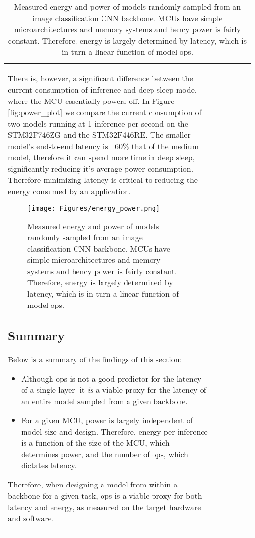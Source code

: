 \documentclass{article}
\begin{document}
\begin{table}[t]
\begin{tabular}{l| c | c | c | c | c}
\if0
There is, however, a significant difference between the current consumption of inference and deep sleep mode, where the MCU essentially powers off. 
In Figure \ref{fig:power_plot} we compare the current consumption of two models running at 1 inference per second on the STM32F746ZG and the STM32F446RE.
The smaller model's end-to-end latency is ~60\% that of the medium model, therefore it can spend more time in deep sleep, significantly reducing it's average power consumption. Therefore minimizing latency is critical to reducing the energy consumed by an application.
\fi



\begin{figure}[t]
    \texttt{[image: Figures/energy\_power.png]}
     \vspace{-20pt}
     \caption{Measured energy and power of models randomly sampled from an image classification CNN backbone.
     MCUs have simple microarchitectures and memory systems and hency power is fairly constant.
     Therefore, energy is largely determined by latency, which is in turn a linear function of model ops.
     }
     \label{fig:model_energy_power}
\end{figure}








\subsection{Summary}

Below is a summary of the findings of this section:
\begin{itemize}
    \item Although ops is not a good predictor for the latency of a single layer, it \textit{is} a viable proxy for the latency of an entire model sampled from a given backbone.
\item For a given MCU, power is largely independent of model size and design.
    Therefore, energy per inference is a function of the size of the MCU, which determines power, and the number of ops, which dictates latency.
\end{itemize}

Therefore, when designing a model from within a backbone for a given task, ops is a viable proxy for both latency and energy, as measured on the target hardware and software.











\end{tabular}
\end{table}
\end{document}
